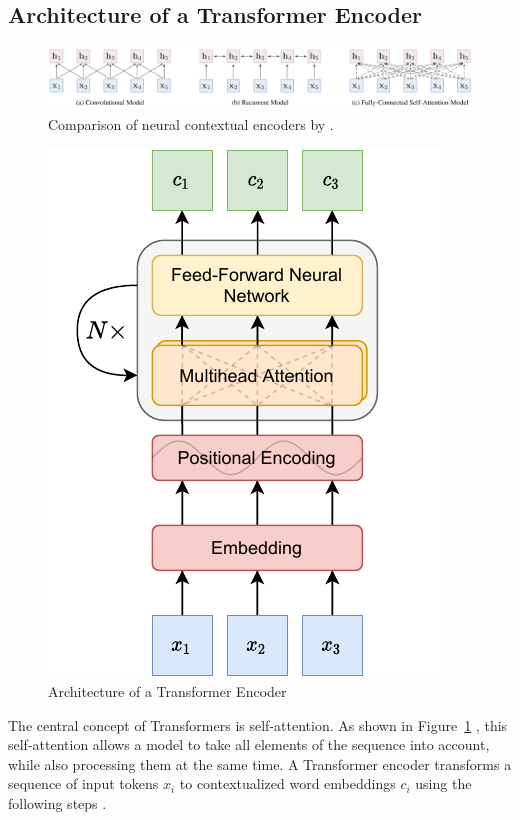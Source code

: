 \documentclass[bsc,deptreport,ai]{infthesis} %
\begin{document}
\subsection{Architecture of a Transformer Encoder}
\label{fig:transformerarch}
\begin{figure}
\centering
\includegraphics[width=\textwidth]{conv_rec_att.PNG}
\caption{Comparison of neural contextual encoders by \citet{transformersurvey}.}
\label{fig:attentioncomparison}
\end{figure}
\begin{figure}[H]
\centering
\includegraphics[width=.4\textwidth]{transformer(2).pdf}
\caption{Architecture of a Transformer Encoder}
\label{fig:transformerencoder}
\end{figure}
The central concept of Transformers is self-attention. As shown in Figure~\ref{fig:attentioncomparison} \citep{transformersurvey}, this self-attention allows a model to take all elements of the sequence into account, while also processing them at the same time. A Transformer encoder transforms a sequence of input tokens $x_i$ to contextualized word embeddings $c_i$ using the following steps \citep{vaswani2017}.
\end{document}
